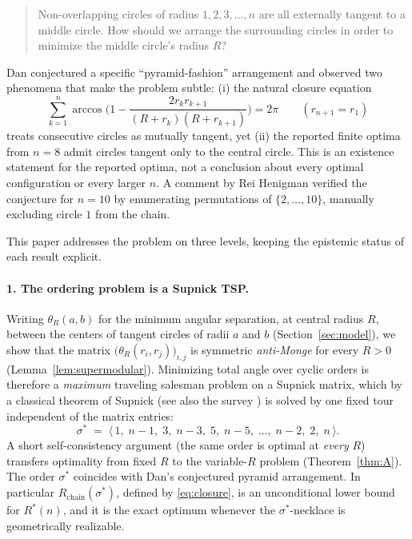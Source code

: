 \documentclass[11pt]{article}
\theoremstyle{definition}
\theoremstyle{remark}
\begin{document}
\begin{quote}
Non-overlapping circles of radius $1,2,3,\dots,n$ are all externally tangent to a middle circle. How should we arrange the surrounding circles in order to minimize the middle circle's radius $R$?
\end{quote}

Dan conjectured a specific ``pyramid-fashion'' arrangement and observed two phenomena that make the problem subtle: (i) the natural closure equation
\begin{equation}\label{eq:closure}
\sum_{k=1}^{n}\arccos\!\Big(1-\frac{2r_kr_{k+1}}{(R+r_k)(R+r_{k+1})}\Big)=2\pi
\qquad (r_{n+1}=r_1)
\end{equation}
treats consecutive circles as mutually tangent, yet (ii) the reported finite optima from $n=8$ admit circles tangent only to the central circle. This is an existence statement for the reported optima, not a conclusion about every optimal configuration or every larger $n$. A comment by Rei Henigman \cite{mse} verified the conjecture for $n=10$ by enumerating permutations of $\{2,\dots,10\}$, manually excluding circle $1$ from the chain.

This paper addresses the problem on three levels, keeping the epistemic status of each result explicit.

\paragraph{1. The ordering problem is a Supnick TSP.}
Writing $\theta_R(a,b)$ for the minimum angular separation, at central radius $R$, between the centers of tangent circles of radii $a$ and $b$ (Section~\ref{sec:model}), we show that the matrix $\big(\theta_R(r_i,r_j)\big)_{i,j}$ is symmetric \emph{anti-Monge} for every $R>0$ (Lemma~\ref{lem:supermodular}). Minimizing total angle over cyclic orders is therefore a \emph{maximum} traveling salesman problem on a Supnick matrix, which by a classical theorem of Supnick \cite{supnick} (see also the survey \cite{bdvvw}) is solved by one fixed tour independent of the matrix entries:
\[
\sigma^\ast \;=\; \langle\, 1,\; n-1,\; 3,\; n-3,\; 5,\; n-5,\;\dots,\; n-2,\; 2,\; n \,\rangle .
\]
A short self-consistency argument (the same order is optimal at \emph{every} $R$) transfers optimality from fixed $R$ to the variable-$R$ problem (Theorem~\ref{thm:A}). The order $\sigma^\ast$ coincides with Dan's conjectured pyramid arrangement. In particular $R_{\mathrm{chain}}(\sigma^\ast)$, defined by \eqref{eq:closure}, is an unconditional lower bound for $R^\ast(n)$, and it is the exact optimum whenever the $\sigma^\ast$-necklace is geometrically realizable.
\end{document}
